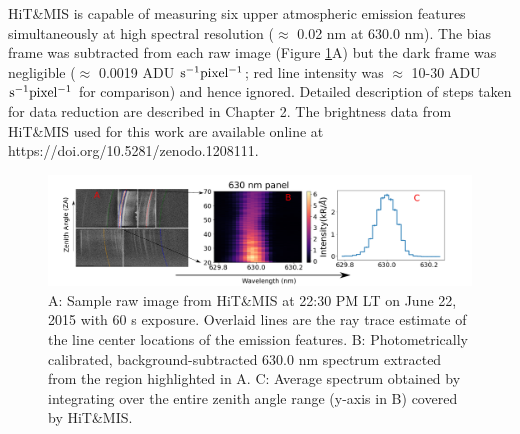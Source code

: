\documentclass[crop=false,class=mitthesis,oneside,font=12pt]{standalone}
\begin{document}
HiT\&MIS is capable of measuring six upper atmospheric 
emission features simultaneously at high spectral resolution ($\approx$ 0.02 nm at 630.0 nm).
 The bias frame was subtracted from each raw image (Figure \ref{fig:raw}A) but the dark frame was negligible ($\approx{}$ 0.0019 ADU $\rm s^{-1} pixel^{-1}$; red line intensity was $\approx$ 10-30 ADU $\rm s^{-1} pixel^{-1}$ for comparison) and hence ignored. Detailed description of steps taken for data reduction are described in Chapter 2. The brightness data from HiT\&MIS used for this work are available online at https://doi.org/10.5281/zenodo.1208111.
\begin{figure}[H]
	\centering\includegraphics[width=35pc]{raw_spec.pdf}
	\caption{A: Sample raw image from HiT\&MIS at 22:30 PM LT on June 22, 2015 with 60 s exposure. Overlaid lines are the ray trace estimate of the line center locations of the emission features. B: Photometrically calibrated, background-subtracted 630.0 nm spectrum extracted from the region highlighted in A. C: Average spectrum obtained by integrating over 
		the entire zenith angle range (y-axis in B) covered by HiT\&MIS.}
	\label{fig:raw}
\end{figure}
\end{document}
